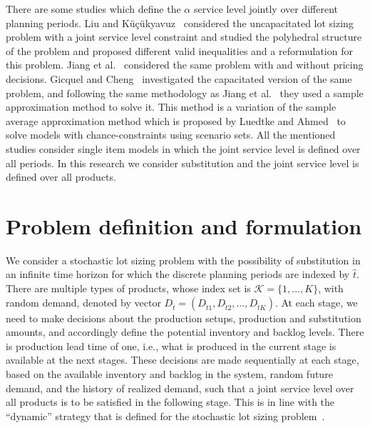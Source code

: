 \documentclass[10pt]{article}
\newcommand{\ti}{t} %
\newcommand{\KA}{\mathcal{K}}
\newcommand{\Ka}{K}
\newcommand{\tAct}{\hat{\ti}} %
\begin{document}
There are some studies which define the $\alpha$ service level jointly over different planning periods. Liu and K{\"u}{\c{c}}{\"u}kyavuz~\cite{liu2018polyhedral} considered the uncapacitated lot sizing problem with a joint service level constraint and studied the polyhedral structure of the problem and proposed different valid inequalities and a reformulation for this problem. Jiang et al.~\cite{jiang2017production} considered the same problem with and without pricing decisions. Gicquel and Cheng~\cite{gicquel2018joint} investigated the capacitated version of the same problem, and following the same methodology as Jiang et al.~\cite{jiang2017production} they used a sample approximation method to solve it. This method is a variation of the sample average approximation method which is proposed by Luedtke and Ahmed~\cite{luedtke2008sample} to solve models with chance-constraints using scenario sets. All the mentioned studies consider single item models in which the joint service level is defined over all periods. In this research we consider substitution and the joint service level is defined over all products.


\section{Problem definition and formulation}
We consider a stochastic lot sizing problem with the possibility of substitution in an infinite time horizon for which the discrete planning periods are indexed by $\tAct$. There are multiple types of products, whose index set is $\KA= \{1,...,\Ka\}$, with random demand, denoted by vector $D_{\tAct} = ({D}_{\tAct 1}, {D}_{\tAct 2},..., {D}_{\tAct \Ka})$. At each stage, we need to make decisions about the production setups, production and substitution amounts, and accordingly define the potential inventory and backlog levels. There is production lead time of one, i.e., what is produced in the current stage is available at the next stages. 
These decisions are made sequentially at each stage, based on the available inventory and backlog in the system, random future demand, and the history of realized demand, such that a joint service level over all products is to be satisfied in the following stage. This is in line with the  ``dynamic'' strategy that is defined for the stochastic lot sizing problem~\cite{bookbinder1988strategies}. 

\end{document}
